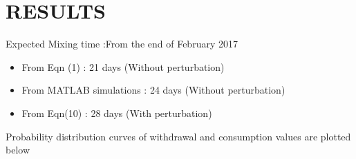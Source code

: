 \documentclass[12pt]{article}
\begin{document}
\section{RESULTS}

Expected Mixing time :From the end of February 2017
\begin{itemize}
\item From Eqn (1) : 21 days (Without perturbation)
\item From MATLAB simulations : 24 days (Without perturbation)
\item From Eqn(10) : 28 days (With perturbation)
\end{itemize}

Probability distribution curves of withdrawal and consumption values are plotted below\\ \\ \\ \\ \\ \\ \\
\end{document}
